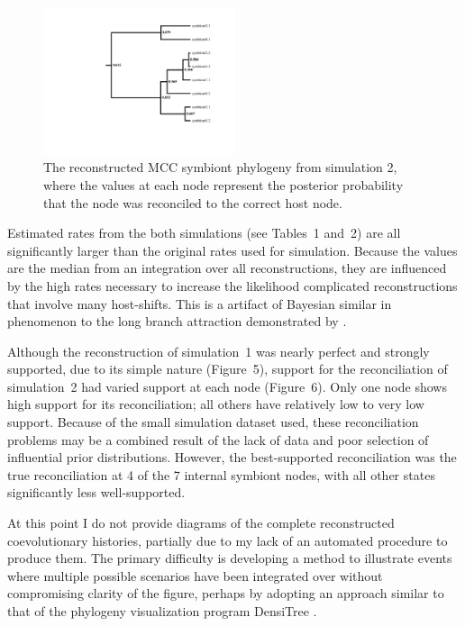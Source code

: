 \documentclass[12pt,letterpaper]{article}
\begin{document}
\begin{figure}
\centering
\includegraphics[width=0.5\textwidth]{figures/sim1.pdf}
\caption{The reconstructed \ac{MCC} symbiont phylogeny from simulation 2, where the values at each node represent the posterior probability that the node was reconciled to the correct host node.}
\label{fig:sim2}
\end{figure}

Estimated rates from the both simulations (see Tables~1 and~2) are all significantly larger than the original rates used for simulation. Because the values are the median from an integration over all reconstructions, they are influenced by the high rates necessary to increase the likelihood complicated reconstructions that involve many host-shifts. This is a artifact of Bayesian similar in phenomenon to the long branch attraction demonstrated by \textcite{Kolaczkowski:2009}.

Although the reconstruction of simulation~1 was nearly perfect and strongly supported, due to its simple nature (Figure~5), support for the reconciliation of simulation~2 had varied support at each node (Figure~6). Only one node shows high support for its reconciliation; all others have relatively low to very low support. Because of the small simulation dataset used, these reconciliation problems may be a combined result of the lack of data and poor selection of influential prior distributions. However, the best-supported reconciliation was the true reconciliation at 4 of the 7 internal symbiont nodes, with all other states significantly less well-supported.

At this point I do not provide diagrams of the complete reconstructed coevolutionary histories, partially due to my lack of an automated procedure to produce them. The primary difficulty is developing a method to illustrate events where multiple possible scenarios have been integrated over without compromising clarity of the figure, perhaps by adopting an approach similar to that of the phylogeny visualization program DensiTree \parencite{Bouckaert:2010}.
\end{document}
